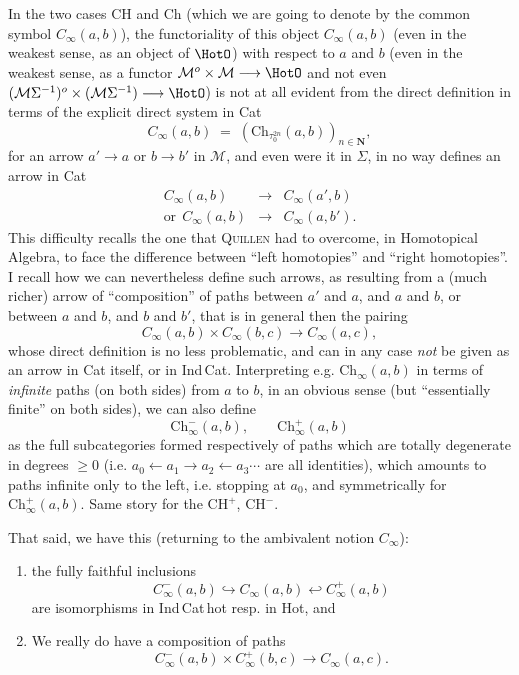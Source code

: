 In the two cases CH and Ch (which we are going to denote by the common symbol $C_{\infty}(a,b)$), the functoriality of this object $C_{\infty}(a,b)$ (even in the weakest sense, as an object of $\HotO$) with respect to $a$ and $b$ (even in the weakest sense, as a functor $\mathcal{M}^o\times\mathcal{M}\longrightarrow\HotO$ and not even $(\mathcal{M}\Sigma^{-1})^o\times(\mathcal{M}\Sigma^{-1})\longrightarrow\HotO$) is not at all evident from the direct definition in terms of the explicit direct system in Cat
\[
C_{\infty}(a,b) \;=\; (\mathrm{Ch}_{\tau_0^{2n}}(a,b))_{n\in\mathbf{N}},
\]
for an arrow $a'\longrightarrow a$ or $b\longrightarrow b'$ in $\mathcal{M}$, and even were it in $\Sigma$, in no way defines an arrow in Cat
\[
\begin{array}{rcl}
C_{\infty}(a,b) & \longrightarrow & C_{\infty}(a',b)\\
\text{or}\ \ C_{\infty}(a,b) & \longrightarrow & C_{\infty}(a,b').
\end{array}
\]
This difficulty recalls the one that \textsc{Quillen} had to overcome, in Homotopical Algebra, to face the difference between ``left homotopies'' and ``right homotopies''. I recall how
we can nevertheless define such arrows, as resulting from a (much richer) arrow of ``composition'' of paths between $a'$ and $a$, and $a$ and $b$, or between $a$ and $b$, and $b$ and $b'$, that is in general then the pairing
\[
C_{\infty}(a,b)\times C_{\infty}(b,c)\longrightarrow C_{\infty}(a,c),
\]
whose direct definition is no less problematic, and can in any case \textit{not} be given as an arrow in Cat itself, or in Ind\,Cat. Interpreting e.g. $\mathrm{Ch}_{\infty}(a,b)$ in terms of \textit{infinite} paths (on both sides) from $a$ to $b$, in an obvious sense (but %
``essentially finite'' on both sides), we can also define %
\[
\mathrm{Ch}^{-}_{\infty}(a,b), \qquad \mathrm{Ch}^{+}_{\infty}(a,b)
\]
as the full subcategories formed respectively of paths which are totally degenerate in degrees $\geq 0$ (i.e. $a_0\longleftarrow a_1\longrightarrow a_2\longleftarrow a_3\cdots$ are all identities), which amounts to paths infinite only to the left, i.e. stopping at $a_0$, and symmetrically for $\mathrm{Ch}^{+}_{\infty}(a,b)$. Same story for the $\mathrm{CH}^{+}$, $\mathrm{CH}^{-}$.

That said, we have this (returning to the ambivalent notion $C_{\infty}$):

\begin{enumerate}
\item[a)] the fully faithful inclusions
\[
C^{-}_{\infty}(a,b)\hookrightarrow C_{\infty}(a,b)\hookleftarrow C^{+}_{\infty}(a,b)
\]
are isomorphisms in Ind\,Cat\,hot resp. in Hot, and
\item[b)] We really do have a composition of paths
\[
C^{-}_{\infty}(a,b)\times C^{+}_{\infty}(b,c)\longrightarrow C_{\infty}(a,c).
\]
\end{enumerate}

